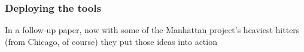 \documentclass[hyperref={colorlinks=true}]{beamer}
\begin{document}
\begin{frame}%
  \frametitle{Deploying the tools}
  
  In a follow-up paper, now with some of the Manhattan project's heaviest hitters (from Chicago, of course) they put those ideas into action
  
  \begin{figure}
    \centering
  \end{figure}
  
\end{frame}

\end{document}
